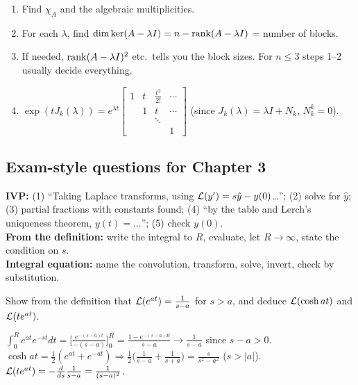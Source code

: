 \begin{methodbox}[title={Method: find the Jordan form of a small matrix}]
\begin{enumerate}
\item Find $\chi_A$ and the algebraic multiplicities.
\item For each $\lambda$, find $\dim\ker(A-\lambda I)=n-\operatorname{rank}(A-\lambda I)$ = number of blocks.
\item If needed, $\operatorname{rank}(A-\lambda I)^2$ etc.\ tells you the block sizes. For $n\le3$ steps 1--2 usually decide everything.
\item $\exp(tJ_k(\lambda))=e^{\lambda t}\begin{bmatrix}1&t&\frac{t^2}{2!}&\cdots\\&1&t&\cdots\\&&\ddots&\\&&&1\end{bmatrix}$ (since $J_k(\lambda)=\lambda I+N_k$, $N_k^k=0$).
\end{enumerate}
\end{methodbox}

\subsection{Exam-style questions for Chapter 3}\label{ss:3-9}
\begin{answerbox}
\textbf{IVP:} (1) ``Taking Laplace transforms, using $\mathcal{L}(y')=s\hat y-y(0)$\dots''; (2) solve for $\hat y$; (3) partial fractions with constants found; (4) ``by the table and Lerch's uniqueness theorem, $y(t)=\dots$''; (5) check $y(0)$.\\
\textbf{From the definition:} write the integral to $R$, evaluate, let $R\to\infty$, state the condition on $s$.\\
\textbf{Integral equation:} name the convolution, transform, solve, invert, check by substitution.
\end{answerbox}
\begin{qbox}[title={Q3.1 (from the definition)}]
Show from the definition that $\mathcal{L}(e^{at})=\frac1{s-a}$ for $s>a$, and deduce $\mathcal{L}(\cosh at)$ and $\mathcal{L}(te^{at})$.
\end{qbox}
\begin{solbox}
$\int_0^Re^{at}e^{-st}dt=\Big[\frac{e^{-(s-a)t}}{-(s-a)}\Big]_0^R=\frac{1-e^{-(s-a)R}}{s-a}\to\frac1{s-a}$ since $s-a>0$.
$\cosh at=\frac12(e^{at}+e^{-at})\Rightarrow\frac12\big(\frac1{s-a}+\frac1{s+a}\big)=\frac{s}{s^2-a^2}$ ($s>|a|$).
$\mathcal{L}(te^{at})=-\frac{d}{ds}\frac1{s-a}=\frac1{(s-a)^2}$.
\end{solbox}

